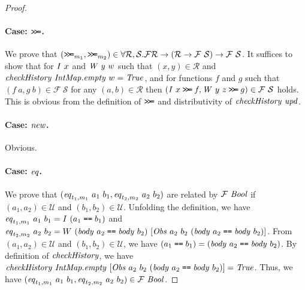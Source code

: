 \documentclass{article}
\theoremstyle{definition}
\newcommand{\BIND}{\mathbin{\texttt{>\!>\!=}}}
\newcommand{\texteq}{\mathrel{\texttt{==}}}
\begin{document}
\begin{proof}
\paragraph{Case: $\BIND$.}
We prove that $(\BIND_{m_1}, \BIND_{m_2}) 
\in \forall \mathcal{R},\mathcal{S}. \mathcal{F} \mathcal{R} \to (\mathcal{R} \to \mathcal{F}~\mathcal{S}) \to \mathcal{F}~\mathcal{S}$.
It suffices to show that for $\mathit{I}~x$ and $\mathit{W}~y~w$ such that $(x,y) \in \mathcal{R}$ and $\mathit{checkHistory}~\mathit{IntMap.empty}~w = \mathit{True}$, and for functions $f$ and $g$ such that $(f~a,g~b) \in \mathcal{F}~\mathcal{S}$ for any $(a,b) \in \mathcal{R}$ then $(\mi{I}~x \BIND f, \mi{W}~y~z \BIND g) \in \mathcal{F}~\mathcal{S}$ holds. This is obvious from the definition of $\BIND$ and distributivity of $\mathit{checkHistory}~\mathit{upd}$.


\paragraph{Case: $\mathit{new}$.} Obvious. 

\paragraph{Case: $\mathit{eq}$.} 
We prove that $(\mathit{eq}_{t_1,m_1}~a_1~b_1, \mathit{eq}_{t_2,m_2}~a_2~b_2)$
are related by $\mathcal{F}~\mathit{Bool}$ if $(a_1,a_2) \in \mathcal{U}$
and $(b_1,b_2) \in \mathcal{U}$. 
Unfolding the definition, we have $\mi{eq}_{t_1,m_1}~a_1~b_1 = I~(a_1 \texteq b_1)$
 and $\mi{eq}_{t_2,m_2}~a_2~b_2 = W~
(\mi{body}~a_2 \texteq
\mi{body}~b_2)~
[\mi{Obs}~a_2~b_2~(\mi{body}~a_2 \texteq
\mi{body}~b_2)]$. 
From $(a_1,a_2) \in \mathcal{U}$ and
$(b_1,b_2) \in \mathcal{U}$, we have $(a_1 \texteq b_1) = (\mi{body}~a_2
\texteq \mi{body}~b_2)$.
By definition of $\mathit{checkHistory}$, we have 
$\mi{checkHistory}~\mi{IntMap.empty}~[\mi{Obs}~a_2~b_2~(\mi{body}~a_2 \texteq
\mi{body}~b_2)] = \mi{True}$.
Thus, we have $(\mathit{eq}_{t_1,m_1}~a_1~b_1, \mathit{eq}_{t_2,m_2}~a_2~b_2) \in \mathcal{F}~\mathit{Bool}$.
\end{proof}
\end{document}
